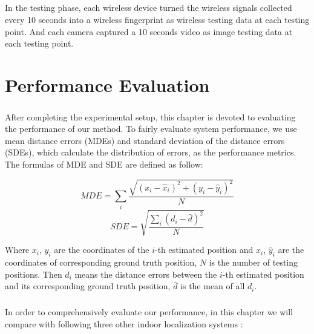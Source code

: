 \documentclass[a4paper,12pt]{report}
\begin{document}
\paragraph{}
In the testing phase, each wireless device turned the wireless signals collected every 10 seconds into a wireless fingerprint as wireless testing data at each testing point. And each camera captured a 10 seconds video as image testing data at each testing point.


\chapter{Performance Evaluation}

\paragraph{}
After completing the experimental setup, this chapter is devoted to evaluating the performance of our method. To fairly evaluate system performance, we use mean distance errors (MDEs) and standard
deviation of the distance errors (SDEs), which calculate the distribution of errors, as the performance metrics. The formulas of MDE and SDE are defined as follow:

\begin{equation}
    MDE = \sum_{i}\dfrac{\sqrt{{(x_i-\widehat{x}_i)}^2 + {(y_i-\widehat{y}_i)}^2}}{N}
\end{equation}
\begin{equation}
    SDE = \sqrt{\dfrac{\sum_{i}{(d_i-\bar{d})}^2}{N}}
\end{equation}

Where $x_i$, $y_i$ are the coordinates of the $i$-th estimated position and $\widehat{x}_i$, $\widehat{y}_i$ are the coordinates of corresponding ground truth position, $N$ is the number of testing positions. Then $d_i$ means the distance errors between the $i$-th estimated position and its corresponding ground truth position, $\bar{d}$ is the mean of all $d_i$.

\paragraph{}
In order to comprehensively evaluate our performance, in this chapter we will compare with following three other indoor localization systems :
\end{document}
